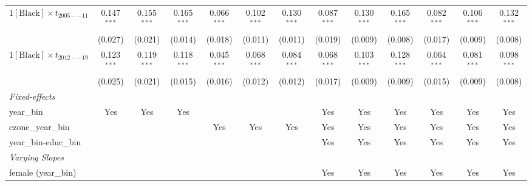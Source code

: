\begin{tabular}{lcccccccccccc}
   $1[\text{Black}] \times t_{2005--11}$   & 0.147$^{***}$ & 0.155$^{***}$         & 0.165$^{***}$       & 0.066$^{***}$ & 0.102$^{***}$         & 0.130$^{***}$       & 0.087$^{***}$ & 0.130$^{***}$         & 0.165$^{***}$       & 0.082$^{***}$ & 0.106$^{***}$         & 0.132$^{***}$\\   
                                           & (0.027)       & (0.021)               & (0.014)             & (0.018)       & (0.011)               & (0.011)             & (0.019)       & (0.009)               & (0.008)             & (0.017)       & (0.009)               & (0.008)\\   
   $1[\text{Black}] \times t_{2012--19}$   & 0.123$^{***}$ & 0.119$^{***}$         & 0.118$^{***}$       & 0.045$^{***}$ & 0.068$^{***}$         & 0.084$^{***}$       & 0.068$^{***}$ & 0.103$^{***}$         & 0.128$^{***}$       & 0.064$^{***}$ & 0.081$^{***}$         & 0.098$^{***}$\\   
                                           & (0.025)       & (0.021)               & (0.015)             & (0.016)       & (0.012)               & (0.012)             & (0.017)       & (0.009)               & (0.009)             & (0.015)       & (0.009)               & (0.008)\\   
   \midrule
   \emph{Fixed-effects}\\
   year\_bin                               & Yes           & Yes                   & Yes                 &               &                       &                     & Yes           & Yes                   & Yes                 & Yes           & Yes                   & Yes\\  
   czone\_year\_bin                        &               &                       &                     & Yes           & Yes                   & Yes                 & Yes           & Yes                   & Yes                 & Yes           & Yes                   & Yes\\  
   year\_bin-educ\_bin                     &               &                       &                     &               &                       &                     & Yes           & Yes                   & Yes                 & Yes           & Yes                   & Yes\\  
   \midrule
   \emph{Varying Slopes}\\
   female (year\_bin)                      &               &                       &                     &               &                       &                     & Yes           & Yes                   & Yes                 & Yes           & Yes                   & Yes\\  

\end{tabular}
